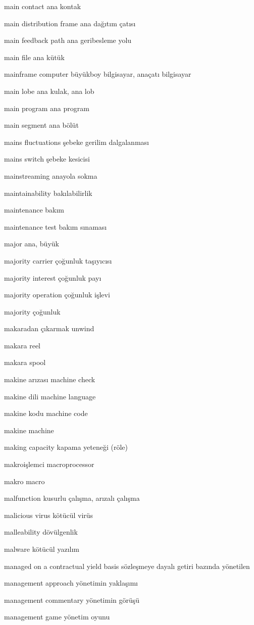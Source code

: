 \documentclass[12pt,fleqn]{article}\usepackage{../../common}
\begin{document}
main contact ana kontak

main distribution frame ana dağıtım çatısı

main feedback path ana geribesleme yolu

main file ana kütük

mainframe computer büyükboy bilgisayar, anaçatı bilgisayar

main lobe ana kulak, ana lob

main program ana program

main segment ana bölüt

mains fluctuations şebeke gerilim dalgalanması

mains switch şebeke kesicisi

mainstreaming anayola sokma

maintainability bakılabilirlik

maintenance bakım

maintenance test bakım sınaması

major ana, büyük

majority carrier çoğunluk taşıyıcısı

majority interest çoğunluk payı

majority operation çoğunluk işlevi

majority çoğunluk

makaradan çıkarmak unwind

makara reel

makara spool

makine arızası machine check

makine dili machine language

makine kodu machine code

makine machine

making capacity kapama yeteneği (röle)

makroişlemci macroprocessor

makro macro

malfunction kusurlu çalışma, arızalı çalışma

malicious virus kötücül virüs

malleability dövülgenlik

malware kötücül yazılım

managed on a contractual yield basis sözleşmeye dayalı getiri bazında yönetilen

management approach yönetimin yaklaşımı

management commentary yönetimin görüşü

management game yönetim oyunu
\end{document}
